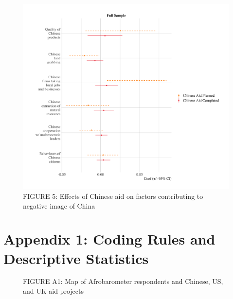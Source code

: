 \documentclass[9pt]{article}
\begin{document}
\begin{figure}[H]
\centering
\includegraphics[width=1\textwidth]{figures/figure_05.png}
\caption{FIGURE 5: Effects of Chinese aid on factors contributing to negative image of China}
\end{figure}

\renewcommand\thefigure{A\arabic{figure}}    
\renewcommand\thetable{A\arabic{table}}    

\setcounter{figure}{0} 
\setcounter{table}{0} 

\appendix
\section{Appendix 1: Coding Rules and Descriptive Statistics}

\begin{figure}[H]
\centering
\caption{FIGURE A1: Map of Afrobarometer respondents and Chinese, US, and UK aid projects}
\end{figure}
\end{document}
